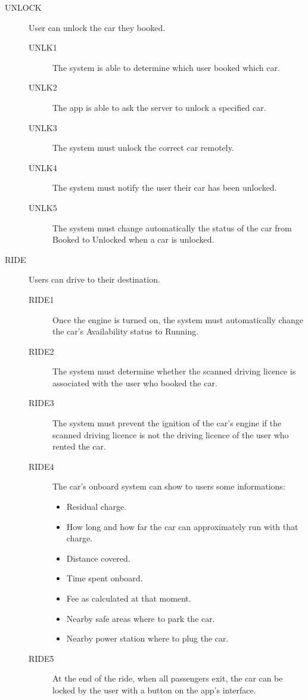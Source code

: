 \documentclass[11pt]{article} %
\begin{document}
\begin{description}
 	\item[UNLOCK] User can unlock the car they booked.
	\begin{description}
	\item[UNLK1] The system is able to determine which user booked which car.
	\item[UNLK2] The app is able to ask the server to unlock a specified car.
	\item[UNLK3] The system must unlock the correct car remotely.
	\item[UNLK4] The system must notify the user their car has been unlocked.
	\item[UNLK5] The system must change automatically the status of the car from Booked to Unlocked when a car is unlocked.
	\end{description}

	\item[RIDE] Users can drive to their destination.
	\begin{description}
	\item[RIDE1] Once the engine is turned on, the system must automatically change the car's Availability status to Running.
	\item[RIDE2] The system must determine whether the scanned driving licence is associated with the user who booked the car.
	\item[RIDE3] The system must prevent the ignition of the car's engine if the scanned driving licence is not the driving licence of the user who rented the car.
	\item[RIDE4] The car's onboard system can show to users some informations:
	\begin{itemize}
		\item Residual charge.
		\item How long and how far the car can approximately run with that charge.
		\item Distance covered.
		\item Time spent onboard.
		\item Fee as calculated at that moment.
		\item Nearby safe areas where to park the car.
		\item Nearby power station where to plug the car.
	\end{itemize}
	\item[RIDE5] At the end of the ride, when all passengers exit, the car can be locked by the user with a button on the app's interface.
 	\end{description}


\end{description}
\end{document}
